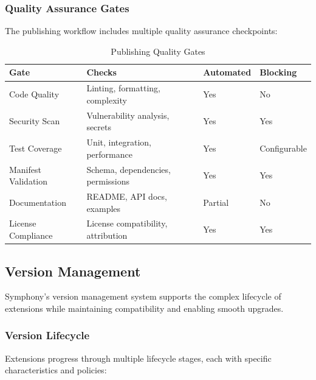 \subsubsection{Quality Assurance Gates}
\label{subsubsec:quality-assurance-gates}

The publishing workflow includes multiple quality assurance checkpoints:

\begin{table}[h]
\centering
\caption{Publishing Quality Gates}
\label{tab:publishing-quality-gates}
\begin{tabular}{@{}llll@{}}
\toprule
\textbf{Gate} & \textbf{Checks} & \textbf{Automated} & \textbf{Blocking} \\
\midrule
Code Quality & Linting, formatting, complexity & Yes & No \\
Security Scan & Vulnerability analysis, secrets & Yes & Yes \\
Test Coverage & Unit, integration, performance & Yes & Configurable \\
Manifest Validation & Schema, dependencies, permissions & Yes & Yes \\
Documentation & README, API docs, examples & Partial & No \\
License Compliance & License compatibility, attribution & Yes & Yes \\
\bottomrule
\end{tabular}
\end{table}

\subsection{Version Management}
\label{subsec:version-management}

Symphony's version management system supports the complex lifecycle of extensions while maintaining compatibility and enabling smooth upgrades.

\subsubsection{Version Lifecycle}
\label{subsubsec:version-lifecycle}

Extensions progress through multiple lifecycle stages, each with specific characteristics and policies:

